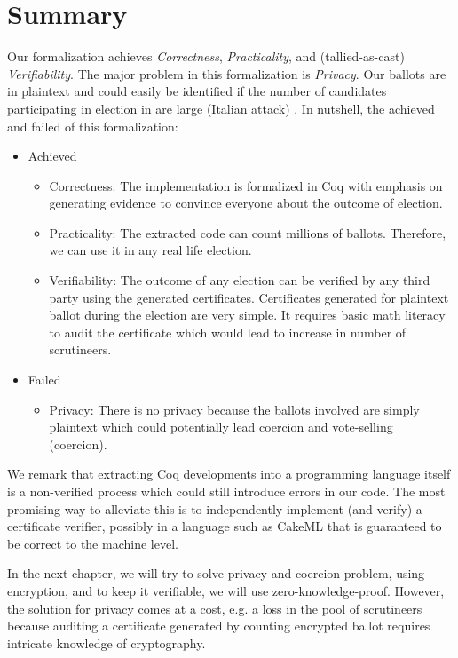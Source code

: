 \section{Summary}

Our formalization achieves \textit{Correctness}, \textit{Practicality}, and 
(tallied-as-cast) \textit{Verifiability}. The major problem in this formalization is \textit{Privacy}.  
Our ballots are in plaintext and could easily be identified
if the number of candidates participating in election in 
are large (Italian attack) \citep{Otten}.
\noindent
In nutshell, the achieved and failed of this formalization:

\begin{itemize}
\item Achieved 
\begin{itemize}
\item Correctness: The implementation is formalized in Coq with emphasis on generating 
         evidence to convince everyone about the outcome of election.
\item Practicality: The extracted code can count millions of ballots. Therefore, we can use it 
          in any real life election.
\item Verifiability: The outcome of any election can be verified by any third party using 
		  the generated certificates. Certificates generated for plaintext ballot 
		  during the election 
          are very simple.  It requires basic math literacy to audit the certificate which would 
          lead to increase in number of scrutineers. 

\end{itemize}
\item Failed
\begin{itemize}
\item Privacy: There is no privacy  because the ballots involved 
         are simply plaintext which could potentially lead coercion and vote-selling (coercion).
\end{itemize}
\end{itemize}

We remark that extracting Coq developments into a
programming language itself is a non-verified process which could
still introduce errors in our code. The most promising way to
alleviate this is to independently implement (and verify) a
certificate verifier, possibly in a language such as CakeML
\citep{Kumar:2014:CVI} that is guaranteed to
be correct to the machine level. 

 In the next chapter, we will try to solve privacy and coercion problem, using encryption, and to keep 
 it verifiable, we will use zero-knowledge-proof. However, the solution for privacy comes at a cost, e.g. 
 a loss in the pool of scrutineers because auditing a certificate generated by counting encrypted ballot 
 requires intricate knowledge of cryptography.
 

